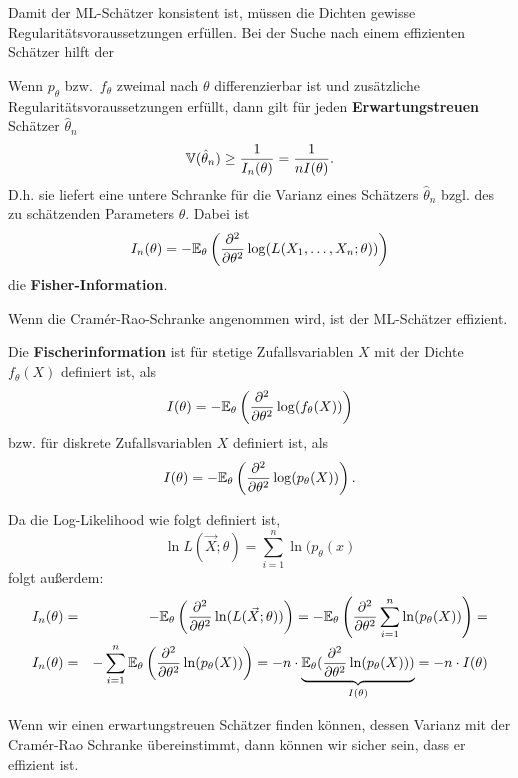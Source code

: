 \ifdefined\uebsps

\newExercPage


\fi


Damit der ML-Schätzer konsistent ist, müssen die Dichten gewisse Regularitätsvoraussetzungen erfüllen.
Bei der Suche nach einem effizienten Schätzer hilft der
\begin{satz}\label{satz:cramer_rao}
Wenn $p_\theta$ bzw.\ $f_\theta$ zweimal nach $\theta$ differenzierbar ist
und zusätzliche Regularitätsvoraussetzungen erfüllt, dann gilt für
jeden \textbf{Erwartungstreuen} Schätzer $\hat\theta_n$
\[\mathbb V(\hat\theta_n)\ge {1\over I_n(\theta)}={1\over nI(\theta)}.\]
D.h. sie liefert eine untere Schranke für die Varianz eines Schätzers $\hat\theta_n$ bzgl. des zu schätzenden Parameters $\theta$.
Dabei ist
\[I_n(\theta)=-\mathbb E_\theta\left({\partial^2\over\partial\theta^2}\log
(L(X_1,\dots,X_n;\theta))\right)\]
die \textbf{Fisher-Information}.

Wenn die Cramér-Rao-Schranke angenommen wird, ist der ML-Schätzer effizient.
\end{satz}

\begin{definition}Die \textbf{Fischerinformation} ist für stetige Zufallsvariablen $X$ mit der Dichte $f_\theta(X)$ definiert ist, als
\[I(\theta)=-\mathbb E_\theta\left({\partial^2\over\partial\theta^2}\log
(f_\theta(X))\right)\]
bzw. für diskrete Zufallsvariablen $X$ definiert ist, als
\[I(\theta)=-\mathbb E_\theta\left({\partial^2\over\partial\theta^2}\log
(p_\theta(X))\right).\]
\end{definition}
Da die Log-Likelihood wie folgt definiert ist, 
\[\ln L(\vec X;\theta)=\sum_{i=1}^n \ln(p_\theta(x)\]
folgt außerdem:
\begin{eqnarray*}
I_n(\theta) &=& -\mathbb E_\theta\left({\partial^2\over\partial\theta^2}\ln
(L(\vec X;\theta))\right) = -\mathbb E_\theta\left({\partial^2\over\partial\theta^2}\sum_{i=1}^n \ln(p_\theta(X))\right)= \\
I_n(\theta) &=& -\sum_{i=1}^n \mathbb E_\theta\left({\partial^2\over\partial\theta^2}\ln(p_\theta(X))\right) = -n\cdot\underbrace{\mathbb E_\theta({\partial^2\over\partial\theta^2}\ln(p_\theta(X)))}_{I(\theta)}=-n\cdot I(\theta)
\end{eqnarray*}

Wenn wir einen erwartungstreuen 
Schätzer finden können, dessen Varianz mit der
Cram\'er-Rao Schranke übereinstimmt, dann können wir sicher sein, dass
er effizient ist. 

